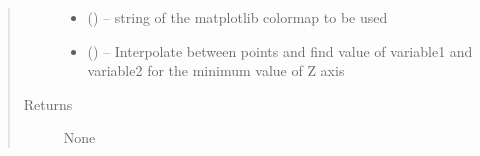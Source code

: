 \documentclass[letterpaper,10pt,english]{sphinxmanual}
\begin{document}
\begin{fulllineitems}
\begin{quote}
\begin{description}
\begin{itemize}
\item {} 
 () -- string of the matplotlib colormap to be used

\item {} 
 () -- Interpolate between points and find value of
variable1 and variable2 for the minimum value of Z axis

\end{itemize}

\item[{Returns}] \leavevmode
None

\end{description}\end{quote}

\end{fulllineitems}

\end{document}
